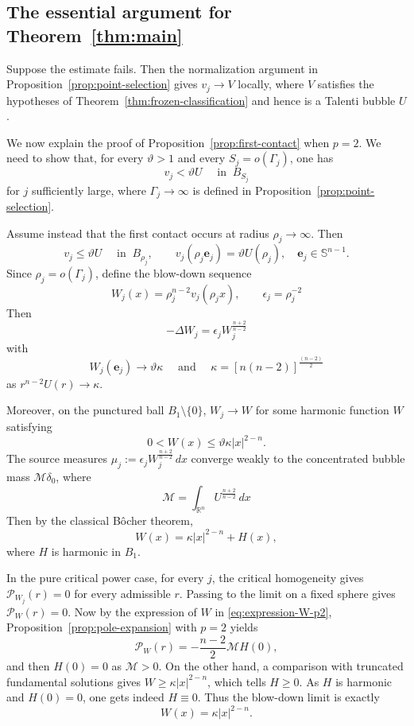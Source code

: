 \documentclass[reqno,12pt]{amsart}
\numberwithin{equation}{section}
\theoremstyle{remark}
\newcommand{\dd}{\,d}
\newcommand{\Pscr}{\mathscr P}
\begin{document}
\subsection{The essential argument for Theorem~\ref{thm:main}}

Suppose the estimate fails. Then the normalization argument in
Proposition~\ref{prop:point-selection} gives
$v_j\to V$ locally, where $V$ satisfies the hypotheses of
Theorem~\ref{thm:frozen-classification} and hence is a Talenti bubble $U$.

We now explain the proof of Proposition~\ref{prop:first-contact} when $p=2$. We need to show that, for every $\vartheta>1$ and every
$S_j=o(\Gamma_j)$, one has
$$
v_j< \vartheta U\quad \text{ in  } \ B_{S_j}
$$
for $j$ sufficiently large, where $\Gamma_j\to \infty$ is defined in Proposition~\ref{prop:point-selection}. 

Assume instead that the first contact occurs at radius $\rho_j\to \infty$. Then 
$$
v_j\le \vartheta U\quad \text{ in  } \ B_{\rho_j},\qquad v_j(\rho_j{\mathbf e}_j)= \vartheta U(\rho_j), \quad {\mathbf e}_j\in \mathbb S^{n-1}. 
$$
Since $\rho_j=o(\Gamma_j)$, define the blow-down sequence
$$
W_j(x)= \rho_j^{n-2} v_j(\rho_jx),\qquad \epsilon_j=\rho_j^{-2}
$$
Then
$$
-\Delta W_j =\epsilon_j W_j^{\frac{n+2}{n-2}} 
$$
with 
$$
W_j(\mathbf{e}_j) \to\vartheta \kappa \quad \text{ and } \quad \kappa=[n(n-2)]^{\frac {(n-2)} 2}
$$
as $r^{n-2}U(r)\to \kappa$. 

Moreover, on the punctured ball $B_1\setminus\{0\}$, 
$W_j\to W$ for some harmonic function $W$ satisfying
$$
0<W(x)\le \vartheta\kappa|x|^{2-n}.
$$
The source measures $\mu_j:=\epsilon_j W_j^{\frac {n+2}{n-2}}\dd x$ converge weakly to the concentrated bubble mass $\mathcal M\delta_0$, where
$$\mathcal M=\int_{\mathbb R^n} U^{\frac{n+2}{n-2}}\dd x$$
Then by  the classical B\^ocher theorem,
\begin{equation}\label{eq:expression-W-p2}
    W(x) = \kappa |x|^{2-n} +H(x), 
\end{equation}
where $H$ is harmonic in $B_1$. 

In the pure critical power case, for every $j$, the critical homogeneity gives $\Pscr_{W_j}(r)=0$ for every admissible $r$. Passing to the limit on a fixed sphere gives $\Pscr_{W}(r)=0$. Now by the expression of $W$ in  \eqref{eq:expression-W-p2}, 
Proposition~\ref{prop:pole-expansion} with $p=2$ yields 
$$\Pscr_W(r)=-\frac{n-2} 2\mathcal M H(0),$$
and then $H(0)=0$ as $\mathcal M>0$. On the other hand, a comparison with truncated fundamental solutions gives $W\ge \kappa|x|^{2-n}$, which tells $H\ge 0$. As $H$ is harmonic and $H(0)=0$, one gets indeed $H\equiv 0$. Thus the  blow-down limit is exactly 
\begin{equation}\label{eq:p2-pole}
    W(x)= \kappa |x|^{2-n}. 
\end{equation}
\end{document}
